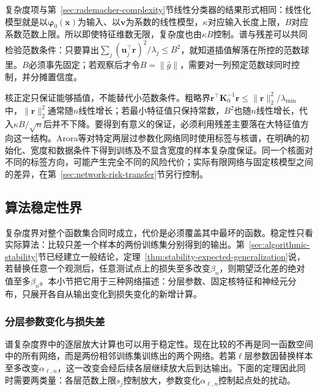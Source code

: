 复杂度项与第~\ref{sec:rademacher-complexity}节线性分类器的结果形式相同：线性化模型就是以$\bm\varphi_0(\bm x)$为输入、以$\bm v$为系数的线性模型，$\kappa$对应输入长度上限，$B$对应系数范数上限。所以即使特征维数无限，复杂度也由$\kappa B$控制。谱与残差可以共同检验范数条件：只要算出$\sum_j(\bm u_j^\top\bm r)^2/\lambda_j\leq B^2$，就知道插值解落在所控的范数球里。$B$必须事先固定；若观察后才令$B=\|\widehat g\|$，需要对一列预定范数球同时控制，并分摊置信度。

核正定只保证能够插值，不能替代小范数条件。粗略界$\bm r^\top\bm K_0^{-1}\bm r\leq\|\bm r\|_2^2/\lambda_{\min}$中，$\|\bm r\|_2^2$通常随$n$线性增长；若最小特征值只保持常数，$B^2$也随$n$线性增长，代入$\kappa B/\sqrt n$后并不下降。要得到有意义的保证，必须利用残差主要落在大特征值方向这一结构。Arora等对特定两层过参数化网络同时使用标签与核谱，在明确的初始化、宽度和数据条件下得到训练及不显含宽度的样本复杂度保证。同一个核面对不同的标签方向，可能产生完全不同的风险代价；实际有限网络与固定核模型之间的差异，在第~\ref{sec:network-risk-transfer}节另行控制。

\subsection{算法稳定性界}

复杂度界对整个函数集合同时成立，代价是必须覆盖其中最坏的函数。稳定性只看实际算法：比较只差一个样本的两份训练集分别得到的输出。第~\ref{sec:algorithmic-stability}节已经建立一般结论，定理~\ref{thm:stability-expected-generalization}说，若替换任意一个观测后，任意测试点上的损失至多改变$\beta_n$，则期望泛化差的绝对值至多$\beta_n$。本小节把它用于三种网络描述：分层参数、固定核特征和神经元分布，只展开各自从输出变化到损失变化的新增计算。

\subsubsection{分层参数变化与损失差}

谱复杂度界中的逐层放大计算也可以用于稳定性。现在比较的不再是同一函数空间中的所有网络，而是两份相邻训练集训练出的两个网络。若第$\ell$层参数因替换样本至多改变$\alpha_{\ell,n}$，这一改变会经后续各层继续放大后到达输出。下面的定理因此同时需要两类量：各层范数上限$s_j$控制放大，参数变化$\alpha_{\ell,n}$控制起点处的扰动。


